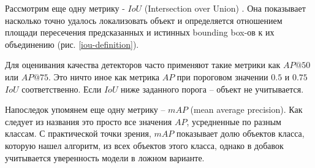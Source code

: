 
Рассмотрим еще одну метрику - $IoU$ (Intersection over Union) \cite{lib-iou-metric}. Она показывает насколько точно удалось локализовать объект и определяется отношением площади пересечения предсказанных и истинных bounding box-ов к их объединению (рис. \ref{iou-definition}). 


Для оценивания качества детекторов часто применяют такие метрики как $AP@50$ или $AP@75$. Это ничто иное как метрика $AP$ при пороговом значении $0.5$ и $0.75$ $IoU$ соответственно. Если $IoU$ ниже заданного порога -- объект не учитывается. 

Напоследок упомянем еще одну метрику -- $mAP$ (mean average precision). Как следует из названия это просто все значения $AP$, усредненные по разным классам. С практической точки зрения, $mAP$ показывает долю объектов класса, которую нашел алгоритм, из всех объектов этого класса, однако в добавок учитывается уверенность модели в ложном варианте.